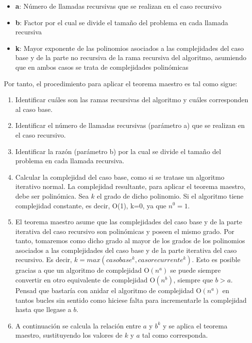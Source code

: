 \begin{itemize}
	\item \textbf{a}: Número de llamadas recursivas que se realizan en el caso recursivo
	\item \textbf{b}: Factor por el cual se divide el tamaño del problema en cada llamada recursiva
	\item \textbf{k}: Mayor exponente de las polinomios asociados a las complejidades del caso base y de la
	parte no recursiva de la rama recursiva del algoritmo, asumiendo que en ambos casos
	se trata de complejidades polinómicas
\end{itemize}


Por tanto, el procedimiento para aplicar el teorema maestro es tal como sigue:

\begin{enumerate}
	\item Identificar cuáles son las ramas recursivas del algoritmo y cuáles corresponden al caso
 base.
    \item Identificar el número de llamadas recursivas (parámetro a) que se realizan en el caso
recursivo.
    \item Identificar la razón (parámetro b) por la cual se divide el tamaño del problema en cada
 llamada recursiva.
    \item Calcular la complejidad del caso base, como si se tratase un algoritmo iterativo normal. La
complejidad resultante, para aplicar el teorema maestro, debe ser polinómica. Sea $k$ el
grado de dicho polinomio. Si el algoritmo tiene complejidad constante, es decir, O(1), k=0, ya que $n^{0} = 1$.
    \item El teorema maestro asume que las complejidades del caso base y de la parte iterativa del
caso recursivo son polinómicas y poseen el mismo grado. Por tanto, tomaremos como
dicho grado al mayor de los grados de los polinomios asociados a las complejidades del
caso base y de la parte iterativa del caso recursivo. Es decir, $k = max(caso base^k,caso recurrente^k)$. Esto es posible
gracias a que un algoritmo de complejidad O$(n^a)$ se puede siempre convertir en otro
    equivalente de complejidad O$(n^b)$, siempre que $b > a$. Pensad que bastaría con anidar el algoritmo de complejidad O$(n^a )$ en tantos bucles sin sentido como hiciese falta para incrementarle la complejidad hasta que llegase a $b$.
    \item A continuación se calcula la relación entre $a$ y $b^k$ y se aplica el teorema maestro, sustituyendo los valores de $k$ y $a$ tal como corresponda.
\end{enumerate}


